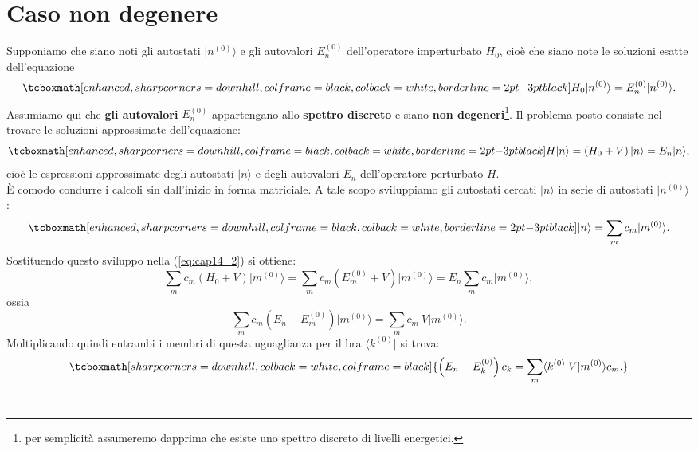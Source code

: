 \section{Caso non degenere}
Supponiamo che siano noti gli autostati $\vert n^{(0)} \rangle$ e gli autovalori $E_n ^{(0)}$ dell'operatore imperturbato $H_0$, cioè che siano note le soluzioni esatte dell'equazione
	\begin{equation}
		\tcboxmath[enhanced, sharp corners=downhill, colframe=black, colback=white, borderline={2pt}{-3pt}{black}]{
			H_0\vert n^{(0)} \rangle=E_n ^{(0)}\vert n^{(0)} \rangle.
			}
	\label{eq:cap14_1}
	\end{equation}
Assumiamo qui che \textbf{gli autovalori} $E_n ^{(0)}$ appartengano allo \textbf{spettro discreto} e siano \textbf{non degeneri}\footnote{per semplicità assumeremo dapprima che esiste uno spettro discreto di livelli energetici.}. Il problema posto consiste nel trovare le soluzioni approssimate dell'equazione:
	\begin{equation}
		\tcboxmath[enhanced, sharp corners=downhill, colframe=black, colback=white, borderline={2pt}{-3pt}{black}]{
			H\vert n \rangle=\left( H_0+ V \right) \vert n \rangle= E_n \vert n \rangle,
			}
	\label{eq:cap14_2}
	\end{equation}
cioè le espressioni approssimate degli autostati $\vert n \rangle$ e degli autovalori $E_n$ dell'operatore perturbato $H$.\\

È comodo condurre i calcoli sin dall'inizio in forma matriciale. A tale scopo sviluppiamo gli autostati cercati $\vert n \rangle$ in serie di autostati $\vert n^{(0)} \rangle$:
	\begin{equation}
		\tcboxmath[enhanced, sharp corners=downhill, colframe=black, colback=white, borderline={2pt}{-3pt}{black}]{
			\vert n \rangle= \sum _m c_m \vert m^{(0)} \rangle.
			}
	\label{eq:cap14_3}
	\end{equation}
Sostituendo questo sviluppo nella (\ref{eq:cap14_2}) si ottiene:
	\begin{equation}
		\sum _m c_m \left( H_0+V\right)\vert m^{(0)} \rangle =\sum _m c_m \left( E_m ^{(0)}+V\right)\vert m^{(0)} \rangle= E_n\sum _m c_m \vert m^{(0)} \rangle,
	\end{equation}
ossia
	\begin{equation}
		\sum _m c_m \left( E_n-E_m ^{(0)}\right)\vert m^{(0)}\rangle=\sum _m c_m\ V\vert m^{(0)}\rangle.
	\end{equation}
Moltiplicando quindi entrambi i membri di questa uguaglianza per il bra $\langle k^{(0)}\vert$ si trova:
	\begin{equation}
		\tcboxmath[sharp corners=downhill, colback=white, colframe=black]{
			\left( E_n-E_k ^{(0)}\right)c_k =\sum _m \langle k^{(0)}\vert V\vert m^{(0)}\rangle c_m.
			}
	\label{eq:cap14_4}
	\end{equation}\\
	
